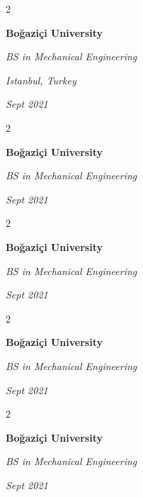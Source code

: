 \documentclass[10pt, letterpaper]{article}
\newenvironment{twocolentry}[2][]{
    \onecolentry
    \def\secondColumn{#2}
    \setcolumnwidth{\fill, 4.5 cm}
    \begin{paracol}{2}
}{
    \switchcolumn \raggedleft \secondColumn
    \end{paracol}
    \endonecolentry
} %
\begin{document}
        \vspace{0.2 cm}

        \begin{twocolentry}{
        \textit{Istanbul, Turkey}    
            
        \textit{Sept 2021}}
            \textbf{Boğaziçi University}

            \textit{BS in Mechanical Engineering}
        \end{twocolentry}



        \vspace{0.2 cm}

        \begin{twocolentry}{
            
            
        \textit{Sept 2021}}
            \textbf{Boğaziçi University}

            \textit{BS in Mechanical Engineering}
        \end{twocolentry}



        \vspace{0.2 cm}

        \begin{twocolentry}{
            
            
        \textit{Sept 2021}}
            \textbf{Boğaziçi University}

            \textit{BS in Mechanical Engineering}
        \end{twocolentry}



        \vspace{0.2 cm}

        \begin{twocolentry}{
            
            
        \textit{Sept 2021}}
            \textbf{Boğaziçi University}

            \textit{BS in Mechanical Engineering}
        \end{twocolentry}



        \vspace{0.2 cm}

        \begin{twocolentry}{
            
            
        \textit{Sept 2021}}
            \textbf{Boğaziçi University}

            \textit{BS in Mechanical Engineering}
        \end{twocolentry}
\end{document}
